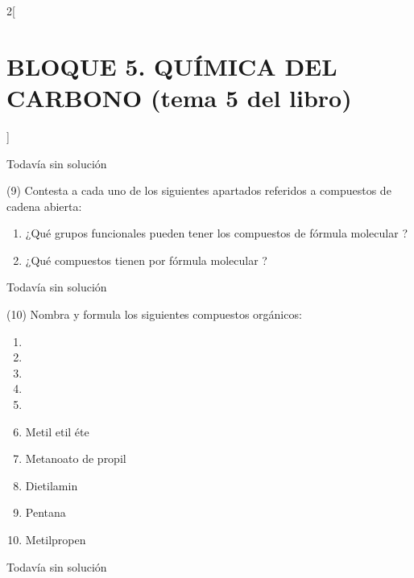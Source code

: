 \documentclass[10pt]{article}
\begin{document}
\begin{multicols}{2}[
  \section{BLOQUE 5. QUÍMICA DEL CARBONO (tema 5 del libro)}
  ]
\begin{solution}[print=false]
  Todavía sin solución
\end{solution}




\begin{exercise}[
    tags    = {},
    topics  = {química, química orgánica, orgánica},
    source  = {FQ 1B MGH 2016, p150, e9},
  ]
  (9) Contesta a cada uno de los siguientes apartados referidos a
  compuestos de cadena abierta:
  \begin{enumerate}
    \item ¿Qué grupos funcionales pueden tener los compuestos de
    fórmula molecular ?
    \item ¿Qué compuestos tienen por fórmula molecular ?
  \end{enumerate}
\end{exercise}

\begin{solution}[print=false]
  Todavía sin solución
\end{solution}




\begin{exercise}[
    tags    = {},
    topics  = {química, química orgánica, orgánica},
    source  = {FQ 1B MGH 2016, p150, e10},
  ]
  (10) Nombra y formula los siguientes compuestos orgánicos:
  \begin{enumerate}
    \item {}
    \item {}
    \item {}
    \item {}
    \item {}
    \item Metil etil éte
    \item Metanoato de propil
    \item Dietilamin
    \item Pentana
    \item Metilpropen
  \end{enumerate}
\end{exercise}

\begin{solution}[print=false]
  Todavía sin solución
\end{solution}





\end{multicols}
\end{document}
